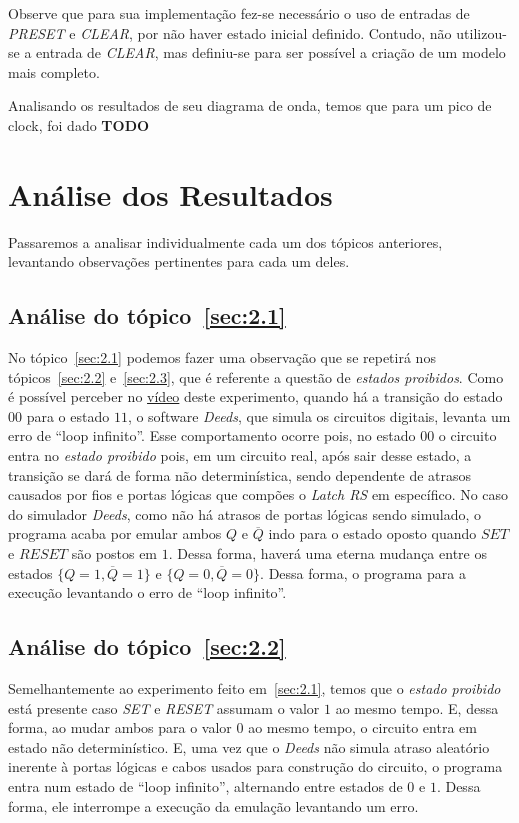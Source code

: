 \documentclass[12pt]{article}
\begin{document}
Observe que para sua implementação fez-se necessário o uso de entradas de
\emph{PRESET} e \emph{CLEAR}, por não haver estado inicial definido. Contudo,
não utilizou-se a entrada de \emph{CLEAR}, mas definiu-se para ser possível a
criação de um modelo mais completo.

Analisando os resultados de seu diagrama de onda, temos que para um pico de
clock, foi dado \textbf{TODO}

\section{Análise dos Resultados}\label{sec:resultados}

Passaremos a analisar individualmente cada um dos tópicos anteriores, levantando
observações pertinentes para cada um deles.

\subsection{Análise do tópico~\ref{sec:2.1}}\label{sec:analise2.1}

No tópico~\ref{sec:2.1} podemos fazer uma observação que se repetirá nos
tópicos~\ref{sec:2.2} e~\ref{sec:2.3}, que é referente a questão de
\emph{estados proibidos}. Como é possível perceber no
\href{https://youtu.be/RH6w3QnfUhA}{vídeo} deste experimento, quando há a
transição do estado $00$ para o estado $11$, o software \emph{Deeds}, que simula
os circuitos digitais, levanta um erro de ``loop infinito''. Esse comportamento
ocorre pois, no estado $00$ o circuito entra no \emph{estado proibido} pois, em
um circuito real, após sair desse estado, a transição se dará de forma não
determinística, sendo dependente de atrasos causados por fios e portas lógicas
que compões o \emph{Latch RS} em específico. No caso do simulador \emph{Deeds},
como não há atrasos de portas lógicas sendo simulado, o programa acaba por
emular ambos $Q$ e $\overline{Q}$ indo para o estado oposto quando $SET$ e
$RESET$ são postos em $1$. Dessa forma, haverá uma eterna mudança entre os
estados $\{Q = 1, \overline{Q} = 1\}$ e $\{Q = 0, \overline{Q} = 0\}$. Dessa
forma, o programa para a execução levantando o erro de ``loop infinito''.

\subsection{Análise do tópico~\ref{sec:2.2}}\label{sec:analise2.2}

Semelhantemente ao experimento feito em~\ref{sec:2.1}, temos que o \emph{estado
  proibido} está presente caso \emph{SET} e \emph{RESET} assumam o valor $1$ ao
mesmo tempo. E, dessa forma, ao mudar ambos para o valor $0$ ao mesmo tempo, o
circuito entra em estado não determinístico. E, uma vez que o \emph{Deeds} não
simula atraso aleatório inerente à portas lógicas e cabos usados para construção
do circuito, o programa entra num estado de ``loop infinito'', alternando entre
estados de $0$ e $1$. Dessa forma, ele interrompe a execução da emulação
levantando um erro.
\end{document}
